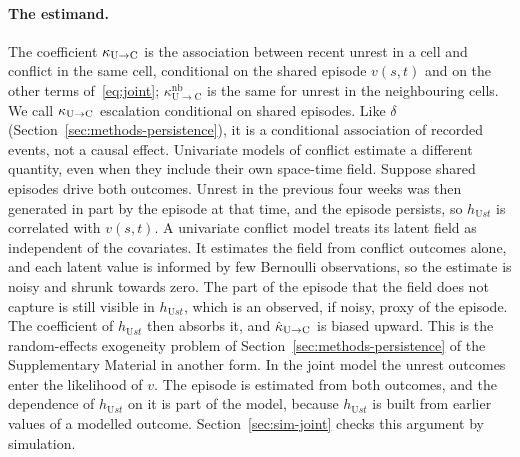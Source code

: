 \paragraph{The estimand.} The coefficient $\kappa_{\mathrm{U}\to\mathrm{C}}$ is the association between recent
unrest in a cell and conflict in the same cell, conditional on the shared episode
$v(s,t)$ and on the other terms of~\eqref{eq:joint}; $\kappa^{\mathrm{nb}}_{\mathrm{U}\to\mathrm{C}}$ is the same
for unrest in the neighbouring cells. We call $\kappa_{\mathrm{U}\to\mathrm{C}}$ escalation conditional on
shared episodes. Like $\delta$ (Section~\ref{sec:methods-persistence}), it is a
conditional association of recorded events, not a causal effect.
Univariate models of conflict estimate a different quantity, even when they include
their own space-time field. Suppose shared episodes drive both outcomes. Unrest in
the previous four weeks was then generated in part by the episode at that time, and
the episode persists, so $h_{\mathrm{U}st}$ is correlated with $v(s,t)$. A univariate
conflict model treats its latent field as independent of the covariates. It estimates
the field from conflict outcomes alone, and each latent value is informed by few
Bernoulli observations, so the estimate is noisy and shrunk towards zero. The part of
the episode that the field does not capture is still visible in $h_{\mathrm{U}st}$,
which is an observed, if noisy, proxy of the episode. The coefficient of
$h_{\mathrm{U}st}$ then absorbs it, and $\hat\kappa_{\mathrm{U}\to\mathrm{C}}$ is biased upward. This is the
random-effects exogeneity problem of Section~\ref{sec:methods-persistence} of the
Supplementary Material in another form. In the joint model the unrest
outcomes enter the likelihood of $v$. The episode is estimated from both outcomes,
and the dependence of $h_{\mathrm{U}st}$ on it is part of the model, because
$h_{\mathrm{U}st}$ is built from earlier values of a modelled outcome.
Section~\ref{sec:sim-joint} checks this argument by simulation.


